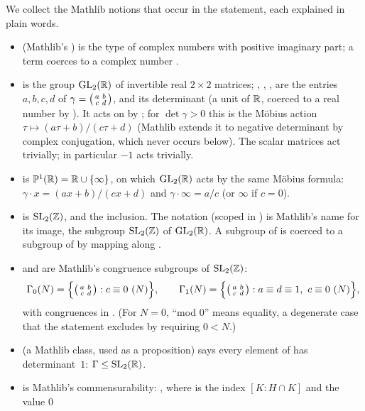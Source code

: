 We collect the Mathlib notions that occur in the statement, each explained in plain words.
\begin{itemize}
\item {} (Mathlib's ) is the type of complex numbers with positive imaginary part; a term
   coerces to a complex number .
\item {} is the group $\mathrm{GL}_2(\mathbb{R})$ of invertible real $2\times2$ matrices; ,
  , ,  are the entries $a,b,c,d$ of $\gamma=\left(\begin{smallmatrix}a&b\\c&d\end{smallmatrix}\right)$, and
   its determinant (a unit of $\mathbb{R}$, coerced to a real number by ).  It acts on
   by ; for $\det\gamma>0$ this is the M\"obius action $\tau\mapsto(a\tau+b)/(c\tau+d)$ (Mathlib
  extends it to negative determinant by complex conjugation, which never occurs below).  The scalar matrices act
  trivially; in particular $-1$ acts trivially.
\item {} is $\mathbb{P}^1(\mathbb{R})=\mathbb{R}\cup\{\infty\}$, on which $\mathrm{GL}_2(\mathbb{R})$ acts by the same M\"obius
  formula: $\gamma\cdot x=(ax+b)/(cx+d)$ and $\gamma\cdot\infty=a/c$ (or $\infty$ if $c=0$).
\item {} is $\mathrm{SL}_2(\mathbb{Z})$, and  the inclusion.  The notation
   (scoped in ) is Mathlib's name for its image, the subgroup $\mathrm{SL}_2(\mathbb{Z})$ of
  $\mathrm{GL}_2(\mathbb{R})$.  A subgroup of  is coerced to a subgroup of  by mapping along
  .
\item {} and  are Mathlib's congruence subgroups of $\mathrm{SL}_2(\mathbb{Z})$:
  \begin{equation*}
    \Gamma_0(N)=\Bigl\{\chsixteenmat abcd: c\equiv0\ (N)\Bigr\},\qquad
    \Gamma_1(N)=\Bigl\{\chsixteenmat abcd: a\equiv d\equiv1,\ c\equiv0\ (N)\Bigr\},
  \end{equation*}
  with congruences in .  (For $N=0$, ``mod $0$'' means equality, a degenerate case that the statement
  excludes by requiring $0<N$.)
\item {} (a Mathlib class, used as a proposition) says every element of  has
  determinant~$1$: $\Gamma\le\mathrm{SL}_2(\mathbb{R})$.
\item {} is Mathlib's commensurability:
  , where  is the index $[K:H\cap K]$ and the value $0$

\end{itemize}
